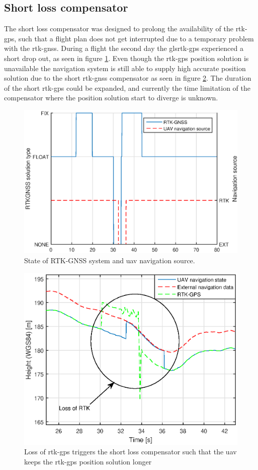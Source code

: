 \subsection{Short loss compensator}
The short loss compensator was designed to prolong the availability of the \gls{rtk-gps}, such that a flight plan does not get interrupted due to a temporary problem with the \gls{rtk-gnss}. During a flight the second day the gls{rtk-gps} experienced a short drop out, as seen in figure \ref{Fig:NavSource}. Even though the \gls{rtk-gps} position solution is unavailable the navigation system is still able to supply high accurate position solution due to the short \gls{rtk-gnss} compensator as seen in figure \ref{Fig:ShortLoss}. The duration of the short \gls{rtk-gps} could be expanded, and currently the time limitation of the compensator where the position solution start to diverge is unknown.
\begin{figure}[H]
\centering
\includegraphics[scale=0.7]{figs/Experiment/navSource.eps}
\caption{State of RTK-GNSS system and \gls{uav} navigation source.}
\label{Fig:NavSource}
\end{figure}
\begin{figure}[H]
\centering
\includegraphics[scale=0.7]{figs/Experiment/shortrtkloss1juni114124.eps}
\caption{Loss of \gls{rtk-gps} triggers the short loss compensator such that the \gls{uav} keeps the \gls{rtk-gps} position solution longer}
\label{Fig:ShortLoss}
\end{figure}
